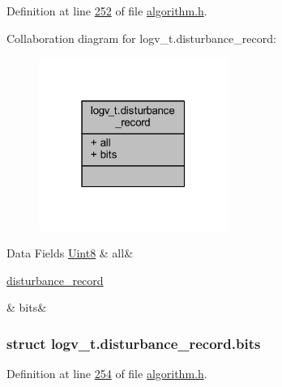 Definition at line \hyperlink{a00021_source_l00252}{252} of file \hyperlink{a00021_source}{algorithm.\+h}.



Collaboration diagram for logv\+\_\+t.\+disturbance\+\_\+record\+:\nopagebreak
\begin{figure}[H]
\begin{center}
\leavevmode
\includegraphics[width=175pt]{d7/d92/a00887}
\end{center}
\end{figure}
\begin{DoxyFields}{Data Fields}
\hypertarget{a00021_aa181a603769c1f98ad927e7367c7aa51}{\hyperlink{a00072_af84840501dec18061d18a68c162a8fa2}{Uint8}}\label{a00021_aa181a603769c1f98ad927e7367c7aa51}
&
all&
\\
\hline

\hypertarget{a00021_acc411e6c13670e52124629b8ac83f7d0}{\hyperlink{a00021_d2/da3/a00593}{disturbance\+\_\+record}}\label{a00021_acc411e6c13670e52124629b8ac83f7d0}
&
bits&
\\
\hline

\end{DoxyFields}
\label{d2/da3/a00593}
\hypertarget{a00021_d2/da3/a00593}{}
\subsubsection{struct logv\+\_\+t.\+disturbance\+\_\+record.\+bits}


Definition at line \hyperlink{a00021_source_l00254}{254} of file \hyperlink{a00021_source}{algorithm.\+h}.




